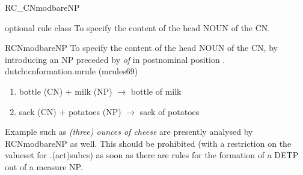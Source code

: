 \begin{mruleclass}{RC\_CNmodbareNP}
\begin{classdescr}
\kind optional rule class
\classtask To specify the content of the head NOUN of the CN.
\classremarks

\nofilters

\nospeedrules

\noplannedrules

\norulesnotince


\end{classdescr}

\begin{members}


\begin{member}
 RCNmodbareNP
 To specify the content of the head NOUN of the CN, by
introducing an NP preceded by {\em of} in postnominal position .
\file dutch:cnformation.mrule (mrules69)
\semantics \nosemantics
\example\mbox{}
\begin{enumerate}
  \item 
bottle (CN) + milk (NP) $\rightarrow$ bottle of milk 
  \item
sack (CN) + potatoes (NP) $\rightarrow$ sack of potatoes
\end{enumerate}
\remarks\mbox{}
Example such as {\em (three) ounces of cheese } 
are presently analysed by RCNmodbareNP 
as well. 
This should be prohibited (with a restriction on the valueset for 
.(act)subcs) as soon as there are rules for the formation of a 
DETP out of a measure NP. 
\end{member}
\end{members}
\end{mruleclass}
